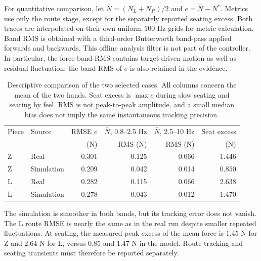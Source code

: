 For quantitative comparison, let $\bar N=(N_L+N_R)/2$ and $e=\bar N-N^*$. Metrics use only the route stage, except for the separately reported seating excess. Both traces are interpolated on their own uniform $100$ Hz grids for metric calculation. Band RMS is obtained with a third-order Butterworth band-pass applied forwards and backwards. This offline analysis filter is not part of the controller. In particular, the force-band RMS contains target-driven motion as well as residual fluctuation; the band RMS of $e$ is also retained in the evidence.

\begin{table}[htbp]\centering\small
\setlength{\tabcolsep}{4pt}
\begin{tabular}{@{}llrrrr@{}}\toprule
Piece & Source & RMSE $e$ & $\bar N$, 0.8--2.5 Hz & $\bar N$, 2.5--10 Hz & Seat excess\\
& & (N) & RMS (N) & RMS (N) & (N)\\\midrule
Z & Real & 0.301 & 0.125 & 0.066 & 1.446\\
Z & Simulation & 0.209 & 0.042 & 0.014 & 0.850\\
L & Real & 0.282 & 0.115 & 0.066 & 2.638\\
L & Simulation & 0.278 & 0.043 & 0.012 & 1.470\\\bottomrule
\end{tabular}
\caption{Descriptive comparison of the two selected cases. All columns concern the mean of the two hands. Seat excess is $\max e$ during slow seating and seating by feel. RMS is not peak-to-peak amplitude, and a small median bias does not imply the same instantaneous tracking precision.}
\label{tab:kinova-real-sim}
\end{table}

The simulation is smoother in both bands, but its tracking error does not vanish. The L route RMSE is nearly the same as in the real run despite smaller repeated fluctuations. At seating, the measured peak excess of the mean force is $1.45$ N for Z and $2.64$ N for L, versus $0.85$ and $1.47$ N in the model. Route tracking and seating transients must therefore be reported separately.


